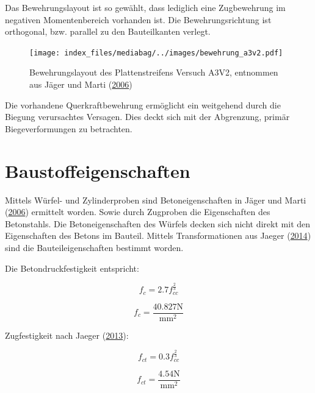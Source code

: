 \documentclass[
  letterpaper,
]{scrreprt}
\begin{document}
Das Bewehrungslayout ist so gewählt, dass lediglich eine Zugbewehrung im
negativen Momentenbereich vorhanden ist. Die Bewehrungsrichtung ist
orthogonal, bzw. parallel zu den Bauteilkanten verlegt.

\begin{figure}[H]

{\centering \texttt{[image: index\_files/mediabag/../images/bewehrung\_a3v2.pdf]}

}

\caption{Bewehrungslayout des Plattenstreifens Versuch A3V2, entnommen
aus Jäger und Marti (\protect\hyperlink{ref-Jaeger2006}{2006})}

\end{figure}

Die vorhandene Querkraftbewehrung ermöglicht ein weitgehend durch die
Biegung verursachtes Versagen. Dies deckt sich mit der Abgrenzung,
primär Biegeverformungen zu betrachten.

\hypertarget{baustoffeigenschaften}{%
\section{Baustoffeigenschaften}\label{baustoffeigenschaften}}

Mittels Würfel- und Zylinderproben sind Betoneigenschaften in Jäger und
Marti (\protect\hyperlink{ref-Jaeger2006}{2006}) ermittelt worden. Sowie
durch Zugproben die Eigenschaften des Betonstahls. Die
Betoneigenschaften des Würfels decken sich nicht direkt mit den
Eigenschaften des Betons im Bauteil. Mittels Transformationen aus Jaeger
(\protect\hyperlink{ref-Jaeger2014}{2014}) sind die Bauteileigenschaften
bestimmt worden.

Die Betondruckfestigkeit entspricht:

\begin{equation}f_{c} = 2.7 f_{cc}^{\frac{2}{3}}\end{equation}

\begin{equation}f_{c} = \frac{40.827 \text{N}}{\text{mm}^{2}}\end{equation}

Zugfestigkeit nach Jaeger (\protect\hyperlink{ref-Jaeger2013}{2013}):

\begin{equation}f_{ct} = 0.3 f_{cc}^{\frac{2}{3}}\end{equation}

\begin{equation}f_{ct} = \frac{4.54 \text{N}}{\text{mm}^{2}}\end{equation}
\end{document}
